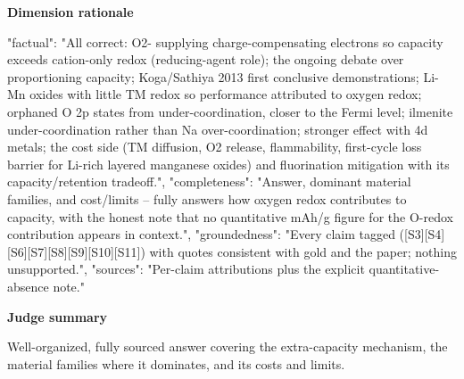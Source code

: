 \documentclass[10pt]{article}
\begin{document}
\textbf{Dimension rationale}
\begin{EvidenceText}
{
  "factual": "All correct: O2- supplying charge-compensating electrons so capacity exceeds cation-only redox (reducing-agent role); the ongoing debate over proportioning capacity; Koga/Sathiya 2013 first conclusive demonstrations; Li-Mn oxides with little TM redox so performance attributed to oxygen redox; orphaned O 2p states from under-coordination, closer to the Fermi level; ilmenite under-coordination rather than Na over-coordination; stronger effect with 4d metals; the cost side (TM diffusion, O2 release, flammability, first-cycle loss barrier for Li-rich layered manganese oxides) and fluorination mitigation with its capacity/retention tradeoff.",
  "completeness": "Answer, dominant material families, and cost/limits -- fully answers how oxygen redox contributes to capacity, with the honest note that no quantitative mAh/g figure for the O-redox contribution appears in context.",
  "groundedness": "Every claim tagged ([S3][S4][S6][S7][S8][S9][S10][S11]) with quotes consistent with gold and the paper; nothing unsupported.",
  "sources": "Per-claim attributions plus the explicit quantitative-absence note."
}
\end{EvidenceText}

\textbf{Judge summary}
\begin{EvidenceText}
Well-organized, fully sourced answer covering the extra-capacity mechanism, the material families where it dominates, and its costs and limits.
\end{EvidenceText}
\end{document}
